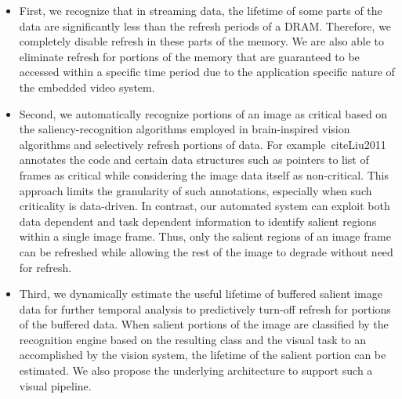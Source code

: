 \begin{itemize}
\item First, we recognize that in streaming data, the lifetime of some parts of the data are significantly less than the refresh periods of a DRAM. Therefore, we completely disable refresh in these parts of the memory. 
We are also able to eliminate refresh for portions of the memory that are guaranteed to be accessed within a specific time period due to the application specific nature of the embedded video system.
\item Second, we automatically recognize portions of an image as critical based on the saliency-recognition algorithms employed in brain-inspired vision algorithms and selectively refresh portions of data.
For example~cite{Liu2011} annotates the code and certain data structures such as pointers to list of frames as critical while considering the image data itself as non-critical. This approach limits the granularity of such annotations, especially when such criticality is data-driven. In contrast, our automated system can exploit both data dependent and task dependent information to identify salient regions within a single image frame. 
Thus, only the salient regions of an image frame can be refreshed while allowing the rest of the image to degrade without need for refresh. 
\item Third, we dynamically estimate the useful lifetime of buffered salient image data for further temporal analysis to predictively turn-off refresh for portions of the buffered data. When salient portions of the image are classified by the recognition engine based on the resulting class and the visual task to an accomplished by the vision system, the lifetime of the salient portion can be estimated. 
We also propose the underlying architecture to support such a visual pipeline.
\end{itemize}

